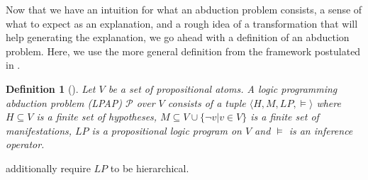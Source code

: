 \documentclass[a4paper]{article}
\newcommand{\problem}{\ensuremath{\mathscr{P}}}
\newcommand{\entails}{\models}
\newtheorem{definition}{Definition}
\begin{document}
Now that we have an intuition for what an abduction problem consists, a sense of what to expect as an explanation, and a rough idea of a transformation that will help generating the explanation, we go ahead with a definition of an abduction problem. Here, we use the more general definition from the framework postulated in \citep{DBLP:journals/tcs/EiterGL97}.
\begin{definition}[{\cite[Definition 1, p.~140]{DBLP:journals/tcs/EiterGL97}}]
\label{def:lpap}
Let $V$ be a set of propositional atoms. A logic programming abduction problem (LPAP) $\problem$ over $V$ consists of a tuple $\langle H, M, LP, \entails \rangle$ where $H \subseteq V$ is a finite set of hypotheses, $M \subseteq V \cup \{ \neg v | v \in V \}$ is a finite set of manifestations, $LP$ is a propositional logic program on $V$ and $\entails$ is an inference operator.
\end{definition}
\citet{DBLP:journals/logcom/ConsoleDT91} additionally require $LP$ to be hierarchical.
\end{document}
